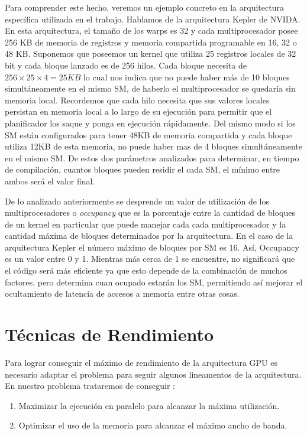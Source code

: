 \documentclass[a4paper,openright,12pt, oneside]{book}
\begin{document}
Para comprender este hecho, veremos un ejemplo concreto en la arquitectura
espec\'ifica utilizada en el trabajo. Hablamos de la arquitectura Kepler de NVIDA.
En esta arquitectura, el tama\~no de los warps es 32 y cada multiprocesador posee
256 KB de memoria de registros y memoria compartida programable en 16, 32 o 48 KB.
Suponemos que poseemos un kernel que utiliza 25 registros locales de 32 bit y 
cada bloque lanzado es de 256 hilos. Cada bloque
necesita de $256 \times 25 \times 4 = 25 KB$ lo cual nos indica que no puede haber
m\'as de 10 bloques simult\'aneamente en el mismo SM, de haberlo el multiprocesador se
quedar\'ia sin memoria local. Recordemos que cada hilo necesita que sus valores locales
persistan en memoria local a lo largo de su ejecuci\'on para permitir que el planificador
los saque y ponga en ejecuci\'on r\'apidamente. Del mismo modo si los SM est\'an configurados
para tener 48KB de memoria compartida y cada bloque utiliza 12KB de esta memoria,
no puede haber mas de 4 bloques simult\'aneamente en el mismo SM. De estos dos
par\'ametros analizados para determinar, en tiempo de compilaci\'on, cuantos bloques
pueden residir el cada SM, el m\'inimo entre ambos ser\'a el valor final.

De lo analizado anteriormente se desprende un valor de utilizaci\'on de los multiprocesadores
o \textit{occupancy} que es la porcentaje entre la cantidad de bloques de un kernel
en particular que puede manejar cada cada multiprocesador y la cantidad m\'axima de
bloques determinados por la arquitectura. En el caso de la arquitectura Kepler el n\'umero m\'aximo
de bloques por SM es 16. As\'i, Occupancy es un valor entre 0 y 1. Mientras m\'as cerca de 1 se encuentre, no significar\'a
que el c\'odigo ser\'a m\'as eficiente ya que esto depende de la combinaci\'on de muchos
factores, pero determina cuan ocupado estar\'an los SM, permitiendo as\'i mejorar
el ocultamiento de latencia de accesos a memoria entre otras cosas.


\section{T\'ecnicas de Rendimiento}

Para lograr conseguir el m\'aximo de rendimiento de la arquitectura GPU es necesario
adaptar el problema para seguir algunos lineamentos de la arquitectura. En nuestro
problema trataremos de conseguir :

\begin{enumerate}
\item Maximizar la ejecuci\'on en paralelo para alcanzar la m\'axima utilizaci\'on.
\item Optimizar el uso de la memoria para alcanzar el m\'aximo ancho de banda.
\end{enumerate}
\end{document}
